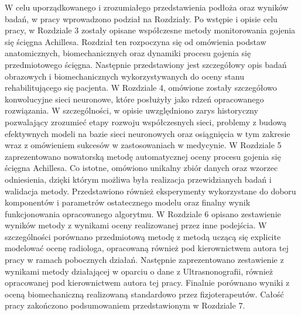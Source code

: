 W celu uporządkowanego i zrozumiałego przedstawienia podłoża oraz wyników badań, w pracy wprowadzono podział na Rozdziały. Po wstępie i opisie celu pracy, w Rozdziale 3 zostały opisane współczesne metody monitorowania gojenia się ścięgna Achillesa. Rozdział ten rozpoczyna się od omówienia podstaw anatomicznych, biomechanicznych oraz dynamiki procesu gojenia się przedmiotowego ścięgna. Następnie przedstawiony jest szczegółowy opis badań obrazowych i biomechanicznych wykorzystywanych do oceny stanu rehabilitującego się pacjenta. W Rozdziale 4, omówione zostały szczegółowo konwolucyjne sieci neuronowe, które posłużyły jako rdzeń opracowanego rozwiązania. W szczególności, w opisie uwzględniono zarys historyczny pozwalający zrozumieć etapy rozwoju współczesnych sieci, problemy z budową efektywnych modeli na bazie sieci neuronowych oraz osiągnięcia w tym zakresie wraz z omówieniem sukcesów w zastosowaniach w medycynie. W Rozdziale 5 zaprezentowano nowatorską metodę automatycznej oceny procesu gojenia się ścięgna Achillesa. Co istotne, omówiono unikalny zbiór danych oraz wzorzec odniesienia, dzięki którym możliwa była realizacja przewidzianych badań i walidacja metody. Przedstawiono również eksperymenty wykorzystane do doboru komponentów i parametrów ostatecznego modelu oraz finalny wynik funkcjonowania opracowanego algorytmu. W Rozdziale 6 opisano zestawienie wyników metody z wynikami oceny realizowanej przez inne podejścia. W szczególności porównano przedmiotową metodę z metodą uczącą się explicite modelować ocenę radiologa, opracowaną również pod kierownictwem autora tej pracy w ramach pobocznych działań. Następnie zaprezentowano zestawienie z wynikami metody działającej w oparciu o dane z Ultrasnonografii, również opracowanej pod kierownictwem autora tej pracy. Finalnie porównano wyniki z oceną biomechaniczną realizowaną standardowo przez fizjoterapeutów. Całość pracy zakończono podsumowaniem przedstawionym w Rozdziale 7.   



